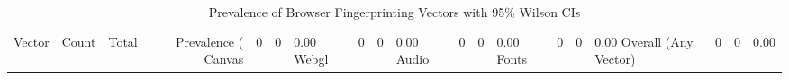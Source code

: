 \begin{table}[htbp]
\centering
\caption{Prevalence of Browser Fingerprinting Vectors with 95\% Wilson CIs}
\label{tab:prevalence_summary}
\begin{tabular}{lrrrrr}
\hline
Vector & Count & Total & Prevalence (%
\hline
Canvas & 0 & 0 & 0.00%
Webgl & 0 & 0 & 0.00%
Audio & 0 & 0 & 0.00%
Fonts & 0 & 0 & 0.00%
Overall (Any Vector) & 0 & 0 & 0.00%
\hline
\end{tabular}
\end{table}
